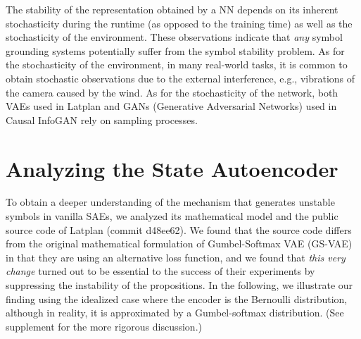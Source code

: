 
The stability of the representation obtained by a NN depends
on
its inherent stochasticity during the runtime (as opposed to the training time) as well as
the stochasticity of the environment.
% 
These observations indicate that \emph{any} symbol grounding systems potentially suffer from 
the symbol stability problem.
% 
As for the stochasticity of the environment,
in many real-world tasks, it is common to obtain stochastic observations
due to the external interference, e.g., vibrations of the camera caused by the wind.
% 
As for the stochasticity of the network,
both
VAEs \cite{kingma2013auto,jang2016categorical,higgins2016beta} used in Latplan
and
GANs (Generative Adversarial Networks) \cite{goodfellow2014generative} used in Causal InfoGAN \cite{kurutach2018learning}
rely on sampling processes.

\section{Analyzing the State Autoencoder}
\label{analysis}

To obtain a deeper understanding of the mechanism that generates
unstable symbols in vanilla SAEs, we
analyzed its mathematical model and the public source code of Latplan (commit d48ee62).
% 
We found that the source code differs from the original mathematical formulation of Gumbel-Softmax VAE (GS-VAE)
in that they are using an alternative loss function,
and we found that \emph{this very change} turned out to be essential to the success of their experiments
by suppressing the instability of the propositions.
In the following, we illustrate our finding using the idealized case where the encoder is the Bernoulli distribution,
although in reality, it is approximated by a Gumbel-softmax distribution.
(See supplement  for the more rigorous discussion.)


